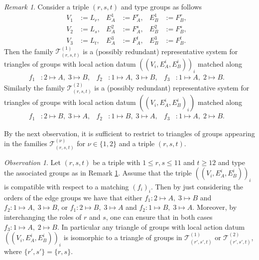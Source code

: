 \documentclass[dvipsnames]{article}
\theoremstyle{definition}
\theoremstyle{remark}
\newtheorem{observation}[theorem]{Observation}
\newtheorem{remark}[theorem]{Remark}
\begin{document}
    \begin{remark}\label{rem:how_to_type_triple}
        Consider a triple $(r,s,t)$ and type groups as follows
        \begin{align*}
            V_1 &:= L_r, & E_A^1 &:= F_A^r, & E_B^1 & := F_B^r, \\
            V_2 &:= L_s, & E_A^2 &:= F_A^s, & E_B^2 & := F_B^s, \\
            V_3 &:= L_t, & E_A^3 &:= F_A^t, & E_B^3 & := F_B^t. &
        \end{align*}
        Then the family $\mathcal T^{(1)}_{(r,s,t)}$ is a (possibly redundant) representative system for triangles of groups with local action datum $((V_i, E_A^i, E_B^i))_i$ matched along 
        \begin{align*}
            f_1 &: 2 \mapsto A,\; 3 \mapsto B,&
            f_2 &: 1 \mapsto A,\; 3 \mapsto B,&
            f_3 &: 1 \mapsto A,\; 2 \mapsto B.&
        \end{align*}
        Similarly the family $\mathcal T^{(2)}_{(r,s,t)}$ is a (possibly redundant) representative system for triangles of groups with local action datum $((V_i, E_A^i, E_B^i)_i)$ matched along 
        \begin{align*}
            f_1 &: 2 \mapsto B,\; 3 \mapsto A,&
            f_2 &: 1 \mapsto B,\; 3 \mapsto A,&
            f_3 &: 1 \mapsto A,\; 2 \mapsto B.&
        \end{align*}
    \end{remark}

    By the next observation, it is sufficient to restrict to triangles of groups appearing in the families $\mathcal T_{(r,s,t)}^{(\nu)}$ for $\nu \in \{1,2\}$ and a triple $(r,s,t)$.
    
    \begin{observation}\label{obs:every_triangle_in_model_family}
        Let $(r,s,t)$ be a triple with $1\leq r,s \leq 11$ and $t \geq 12$ and type the associated groups as in Remark \ref{rem:how_to_type_triple}.
        Assume that the triple $((V_i, E_A^i, E_B^i))_i$ is compatible with respect to a matching $(f_i)_i$. Then by just considering the orders of the edge groups we have that either $f_1 : 2 \mapsto A,\; 3 \mapsto B$ and $f_2 : 1 \mapsto A,\; 3 \mapsto B$, or $f_1 : 2 \mapsto B,\; 3 \mapsto A$ and $f_2 : 1 \mapsto B,\; 3 \mapsto A$. Moreover, by interchanging the roles of $r$ and $s$, one can ensure that in both cases $f_3 : 1 \mapsto A,\; 2 \mapsto B$.
        In particular any triangle of groups with local action datum $((V_i, E_A^i, E_B^i))_i$ is isomorphic to a triangle of groups in $\mathcal T^{(1)}_{(r',s',t)}$ or $\mathcal T^{(2)}_{(r',s',t)}$, where $\{r',s'\} = \{r,s\}$.
    \end{observation}
\end{document}
